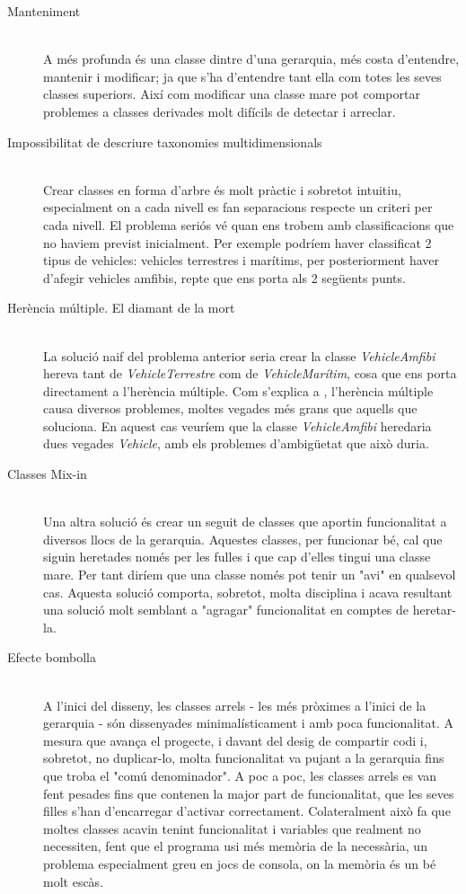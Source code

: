 \begin{description}
  \item[Manteniment] \hfill \\
    A més profunda és una classe dintre d'una gerarquia, més costa d'entendre, mantenir i modificar; ja que s'ha d'entendre tant ella com totes les seves classes superiors. Així com modificar una classe mare pot comportar problemes  a classes derivades molt difícils de detectar i arreclar.
    
  \item[Impossibilitat de descriure taxonomies multidimensionals] \hfill \\
    Crear classes en forma d'arbre és molt pràctic i sobretot intuitiu, especialment on a cada nivell es fan separacions respecte un criteri per cada nivell. El problema seriós vé quan ens trobem amb classificacions que no haviem previst inicialment. Per exemple podríem haver classificat 2 tipus de vehicles: vehicles terrestres i marítims, per posteriorment haver d'afegir vehicles amfibis, repte que ens porta als 2 següents punts.
    
  \item[Herència múltiple. El diamant de la mort] \hfill \\
    La solució naif del problema anterior seria crear la classe {\em VehicleAmfibi} hereva tant de {\em VehicleTerrestre} com de {\em VehicleMarítim}, cosa que ens porta directament a l'herència múltiple. Com s'explica a \cite[p.~2]{Martin97}, l'herència múltiple causa diversos problemes, moltes vegades més grans que aquells que soluciona. En aquest cas veuríem que la classe {\em VehicleAmfibi} heredaria dues vegades {\em Vehicle}, amb els problemes d'ambigüetat que això duria.
    
  \item[Classes Mix-in] \hfill \\
    Una altra solució és crear un seguit de classes que aportin funcionalitat a diversos llocs de la gerarquia. Aquestes classes, per funcionar bé, cal que siguin heretades només per les fulles i que cap d'elles tingui una classe mare. Per tant diríem que una classe només pot tenir un "avi" en qualsevol cas. Aquesta solució comporta, sobretot, molta disciplina i acava resultant una solució molt semblant a "agragar" funcionalitat en comptes de heretar-la.
    
  \item[Efecte bombolla] \hfill \\
    A l'inici del disseny, les classes arrels - les més pròximes a l'inici de la gerarquia - són dissenyades minimalísticament i amb poca funcionalitat. A mesura que avança el progecte, i davant del desig de compartir codi i, sobretot, no duplicar-lo, molta funcionalitat va pujant a la gerarquia fins que troba el "comú denominador". A poc a poc, les classes arrels es van fent pesades fins que contenen la major part de funcionalitat, que les seves filles s'han d'encarregar d'activar correctament. Colateralment això fa que moltes classes acavin tenint funcionalitat i variables que realment no necessiten, fent que el programa usi més memòria de la necessària, un problema especialment greu en jocs de consola, on la memòria és un bé molt escàs.
    

\end{description}
